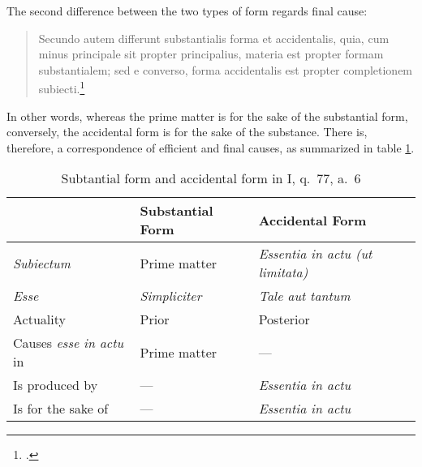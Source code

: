 The second difference between the two types of form regards final cause:
%
\begin{quotation}
Secundo autem differunt substantialis forma et accidentalis, quia, cum minus principale sit propter principalius, materia est propter formam substantialem; sed e converso, forma accidentalis est propter completionem subiecti.\footcite[I, q.~77, a.~6, co.]{st:summa}
\end{quotation}
%
In other words, whereas the prime matter is for the sake of the substantial form, conversely, the accidental form is for the sake of the substance. There is, therefore, a  correspondence of efficient and final causes, as summarized in table \ref{tab:powers-of-soul}.
%
\begin{table}
  \centering
  \begin{OnehalfSpacing}
    \begin{tabular}{lll}
      \toprule
                           & \textbf{Substantial Form} & \textbf{Accidental Form} \\
      \midrule
        \emph{Subiectum}   & Prime matter              & \emph{Essentia in actu (ut limitata)}  \\
        \emph{Esse}        & \emph{Simpliciter}        & \emph{Tale aut tantum}   \\
        Actuality          & Prior                     & Posterior                \\
        Causes \emph{esse in actu} in & Prime matter   & \hspace{6pt}—          \\
        Is produced by     & \hspace{6pt}—           & \emph{Essentia in actu}  \\
        Is for the sake of & \hspace{6pt}—           & \emph{Essentia in actu}  \\
      \bottomrule
    \end{tabular}
  \end{OnehalfSpacing}
  \caption{Subtantial form and accidental form in I, q.~77, a.~6}
  \label{tab:powers-of-soul}
\end{table}
%


